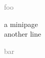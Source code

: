 \documentclass{article}
\begin{document}

\noindent
\textcolor{gray}{foo}%
\begin{minipage}[t]{2cm}

a minipage \\
another line

\end{minipage}
\textcolor{gray}{bar}%
\end{document}
